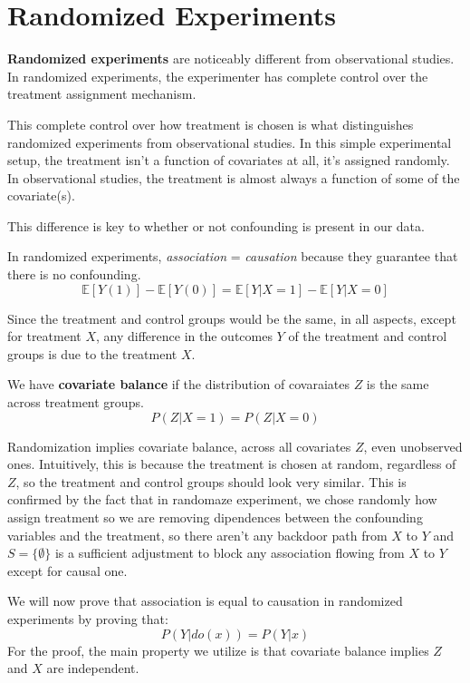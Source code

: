 \chapter{Randomized Experiments}
\textbf{Randomized experiments} are noticeably different from observational studies.
In randomized experiments, the experimenter has complete control over the treatment
assignment mechanism.

This complete control over how treatment is chosen is what distinguishes randomized experiments from observational studies. In this simple experimental setup, the treatment 
isn’t a function of covariates at all, it's assigned randomly. In observational studies, the treatment is almost always a function of some of the covariate(s).

This difference is key to whether or not confounding is present in our data.

In randomized experiments, \textit{association} = \textit{causation} because they guarantee that there is no confounding.
\begin{equation}
    \mathbb{E}[Y(1)] -  \mathbb{E}[Y(0)] = \mathbb{E}[Y| X = 1] - \mathbb{E}[Y | X = 0]
\end{equation}

Since the treatment and control groups would be the same, in all aspects, except for treatment $X$, any difference in the outcomes $Y$ of the treatment and control groups is due to the treatment $X$.
\begin{definition}
    We have \textbf{covariate balance} if the distribution of covaraiates $Z$ is the same across treatment groups.
    \begin{equation}
        P(Z|X = 1) = P(Z|X = 0)
    \end{equation}
\end{definition}

Randomization implies covariate balance, across all covariates $Z$, even unobserved ones. Intuitively, this is because the treatment is chosen at random, regardless of $Z$, so the treatment and control groups should look very similar.
This is confirmed by the fact that in randomaze experiment, we chose randomly how 
assign treatment so we are removing dipendences between the confounding variables 
and the treatment, so there aren't any backdoor path from $X$ to $Y$ and $S=\{\emptyset\}$ 
is a sufficient adjustment to block any association flowing from $X$ to $Y$ except for 
causal one.

We will now prove that association is equal to causation in randomized experiments by proving that:
\begin{equation*}
    P(Y|do(x)) = P(Y|x)
\end{equation*}
For the proof, the main property we utilize is that covariate balance implies $Z$ and $X$ are independent.

